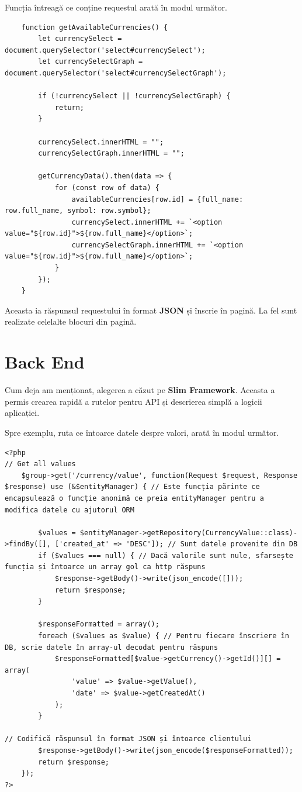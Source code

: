 \documentclass[12pt. a4paper]{report}
\begin{document}
Funcția întreagă ce conține requestul arată în modul următor.
\begin{verbatim}
    function getAvailableCurrencies() {
        let currencySelect = document.querySelector('select#currencySelect');
        let currencySelectGraph = document.querySelector('select#currencySelectGraph');

        if (!currencySelect || !currencySelectGraph) {
            return;
        }

        currencySelect.innerHTML = "";
        currencySelectGraph.innerHTML = "";

        getCurrencyData().then(data => {
            for (const row of data) {
                availableCurrencies[row.id] = {full_name: row.full_name, symbol: row.symbol};
                currencySelect.innerHTML += `<option value="${row.id}">${row.full_name}</option>`;
                currencySelectGraph.innerHTML += `<option value="${row.id}">${row.full_name}</option>`;
            }
        });
    }
\end{verbatim}

Aceasta ia răspunsul requestului în format \textbf{JSON} și înscrie în pagină. La fel sunt realizate celelalte blocuri din pagină.

\section{Back End}
Cum deja am menționat, alegerea a căzut pe \textbf{Slim Framework}. Aceasta a permis crearea rapidă a rutelor pentru API și descrierea simplă a logicii aplicației.

Spre exemplu, ruta ce întoarce datele despre valori, arată în modul următor.

\begin{verbatim}
<?php
// Get all values
    $group->get('/currency/value', function(Request $request, Response $response) use (&$entityManager) { // Este funcția părinte ce encapsulează o funcție anonimă ce preia entityManager pentru a modifica datele cu ajutorul ORM
   
        $values = $entityManager->getRepository(CurrencyValue::class)->findBy([], ['created_at' => 'DESC']); // Sunt datele provenite din DB
        if ($values === null) { // Dacă valorile sunt nule, sfarsește funcția și întoarce un array gol ca http răspuns
            $response->getBody()->write(json_encode([]));
            return $response;
        }

        $responseFormatted = array();
        foreach ($values as $value) { // Pentru fiecare înscriere în DB, scrie datele în array-ul decodat pentru răspuns
            $responseFormatted[$value->getCurrency()->getId()][] = array(
                'value' => $value->getValue(),
                'date' => $value->getCreatedAt()
            );
        }

// Codifică răspunsul în format JSON și întoarce clientului
        $response->getBody()->write(json_encode($responseFormatted));
        return $response;
    });
?>
\end{verbatim}
\end{document}
